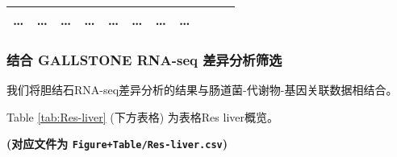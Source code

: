 \documentclass[
]{article}
\begin{document}
\begin{longtable}[]{@{}lllllllllll@{}}
\begin{minipage}[t]{0.09\columnwidth}
\ldots{}\strut
\end{minipage} & \begin{minipage}[t]{0.07\columnwidth}\raggedright
\ldots{}\strut
\end{minipage} & \begin{minipage}[t]{0.07\columnwidth}\raggedright
\ldots{}\strut
\end{minipage} & \begin{minipage}[t]{0.09\columnwidth}\raggedright
\ldots{}\strut
\end{minipage} & \begin{minipage}[t]{0.07\columnwidth}\raggedright
\ldots{}\strut
\end{minipage} & \begin{minipage}[t]{0.07\columnwidth}\raggedright
\ldots{}\strut
\end{minipage} & \begin{minipage}[t]{0.07\columnwidth}\raggedright
\ldots{}\strut
\end{minipage} & \begin{minipage}[t]{0.03\columnwidth}\raggedright
\ldots{}\strut
\end{minipage}\tabularnewline
\bottomrule
\end{longtable}

\begin{center}\vspace{1.5cm}\end{center}

\hypertarget{ux7ed3ux5408-gallstone-rna-seq-ux5deeux5f02ux5206ux6790ux7b5bux9009}{%
\subsubsection{结合 GALLSTONE RNA-seq 差异分析筛选}\label{ux7ed3ux5408-gallstone-rna-seq-ux5deeux5f02ux5206ux6790ux7b5bux9009}}

我们将胆结石RNA-seq差异分析的结果与肠道菌-代谢物-基因关联数据相结合。

\begin{center}\vspace{1.5cm}\end{center}

Table \ref{tab:Res-liver} (下方表格) 为表格Res liver概览。

\textbf{(对应文件为 \texttt{Figure+Table/Res-liver.csv})}
\end{document}
